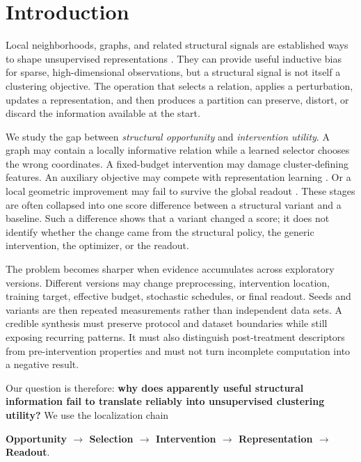 \section{Introduction}

Local neighborhoods, graphs, and related structural signals are established
ways to shape unsupervised representations \citep{xu2024sccdcg,li2025dcboost}.
They can provide useful inductive bias for sparse, high-dimensional observations,
but a structural signal is not itself a clustering objective. The operation that
selects a relation, applies a perturbation, updates a representation, and then
produces a partition can preserve, distort, or discard the information available
at the start.

We study the gap between \emph{structural opportunity} and
\emph{intervention utility}. A graph may contain a locally informative relation
while a learned selector chooses the wrong coordinates. A fixed-budget
intervention may damage cluster-defining features. An auxiliary objective may
compete with representation learning \citep{yan2026scmib}. Or a local geometric
improvement may fail to survive the global readout \citep{li2025dcboost}.
These stages are often collapsed into one score difference between a structural
variant and a baseline. Such a difference shows that a variant changed a score;
it does not identify whether the change came from the structural policy, the
generic intervention, the optimizer, or the readout.

The problem becomes sharper when evidence accumulates across exploratory
versions. Different versions may change preprocessing, intervention location,
training target, effective budget, stochastic schedules, or final readout.
Seeds and variants are then repeated measurements rather than independent data
sets. A credible synthesis must preserve protocol and dataset boundaries while
still exposing recurring patterns. It must also distinguish post-treatment
descriptors from pre-intervention properties and must not turn incomplete
computation into a negative result.

Our question is therefore: \textbf{why does apparently useful structural
information fail to translate reliably into unsupervised clustering utility?}
We use the localization chain

\begin{center}
\textbf{Opportunity $\rightarrow$ Selection $\rightarrow$ Intervention
$\rightarrow$ Representation $\rightarrow$ Readout}.
\end{center}

